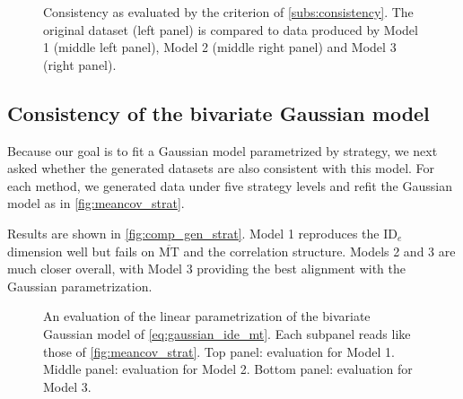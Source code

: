 \documentclass[acmlarge, manuscript,review]{acmart}
\newcommand{\mmt}{\ensuremath{\overline{\mt}}\xspace}
\newcommand{\mt}{\ensuremath{{\text{MT}}}\xspace}
\newcommand{\ide}{\ensuremath{{\text{ID}_e}}\xspace}
\begin{document}
\begin{figure}[htbp]
	\centering
	\caption{Consistency as evaluated by the criterion of \autoref{subs:consistency}. The original dataset (left panel) is compared to data produced by Model 1 (middle left panel), Model 2 (middle right panel) and Model 3 (right panel).}
	\label{fig:consistency}
\end{figure}

\subsection{Consistency of the bivariate Gaussian model}
Because our goal is to fit a Gaussian model parametrized by strategy, we next asked whether the generated datasets are also consistent with this model. For each method, we generated data under five strategy levels and refit the Gaussian model as in \autoref{fig:meancov_strat}.

Results are shown in \autoref{fig:comp_gen_strat}. Model 1 reproduces the \ide dimension well but fails on \mmt and the correlation structure. Models 2 and 3 are much closer overall, with Model 3 providing the best alignment with the Gaussian parametrization.


\begin{figure}[htbp]
	\centering

	\caption{An evaluation of the linear parametrization of the bivariate Gaussian model of \autoref{eq:gaussian_ide_mt}. Each subpanel reads like those of \autoref{fig:meancov_strat}. Top panel: evaluation for Model 1. Middle panel: evaluation for Model 2. Bottom panel: evaluation for Model 3.}
	\label{fig:comp_gen_strat}
\end{figure}

\end{document}
